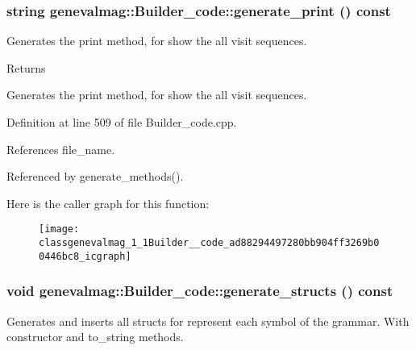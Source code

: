 \hypertarget{classgenevalmag_1_1Builder__code_ad88294497280bb904ff3269b00446bc8}{
\subsubsection[{generate\_\-print}]{\setlength{\rightskip}{0pt plus 5cm}string genevalmag::Builder\_\-code::generate\_\-print () const}}
\label{classgenevalmag_1_1Builder__code_ad88294497280bb904ff3269b00446bc8}
Generates the print method, for show the all visit sequences. \begin{DoxyReturn}{Returns}

\end{DoxyReturn}
Generates the print method, for show the all visit sequences. 

Definition at line 509 of file Builder\_\-code.cpp.



References file\_\-name.



Referenced by generate\_\-methods().



Here is the caller graph for this function:\nopagebreak
\begin{figure}[H]
\begin{center}
\leavevmode
\texttt{[image: classgenevalmag\_1\_1Builder\_\_code\_ad88294497280bb904ff3269b00446bc8\_icgraph]}
\end{center}
\end{figure}


\hypertarget{classgenevalmag_1_1Builder__code_a5dcd144389b5612a328fede4317d414f}{
\subsubsection[{generate\_\-structs}]{\setlength{\rightskip}{0pt plus 5cm}void genevalmag::Builder\_\-code::generate\_\-structs () const}}
\label{classgenevalmag_1_1Builder__code_a5dcd144389b5612a328fede4317d414f}
Generates and inserts all structs for represent each symbol of the grammar. With constructor and to\_\-string methods.


